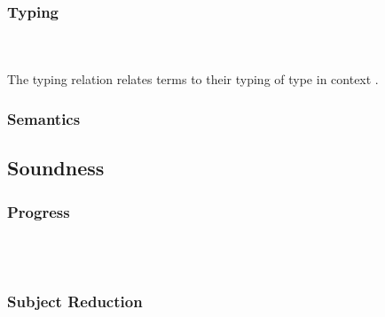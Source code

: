 \subsubsection{Typing}\hfill\\\\
The typing relation    \Data{:}  relates terms  to their typing of type    in context .
\FTyping

\subsubsection{Semantics}

\subsection{Soundness}
\subsubsection{Progress}\hfill\\\\
\subsubsection{Subject Reduction}
